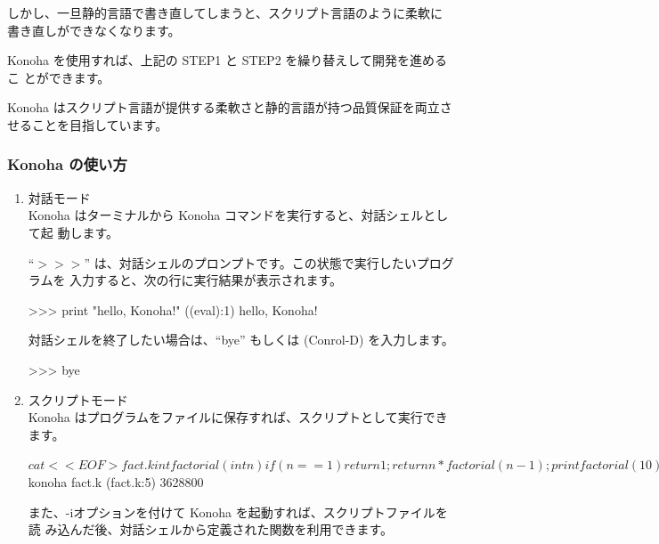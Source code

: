 \documentclass[mingoth,a4paper]{jsarticle}
\begin{document}
しかし、一旦静的言語で書き直してしまうと、スクリプト言語のように柔軟に
書き直しができなくなります。

Konoha を使用すれば、上記の STEP1 と STEP2 を繰り替えして開発を進めるこ
とができます。

Konoha はスクリプト言語が提供する柔軟さと静的言語が持つ品質保証を両立さ
せることを目指しています。

\subsubsection{Konoha の使い方}
\begin{enumerate}
\item 対話モード\\
Konoha はターミナルから Konoha コマンドを実行すると、対話シェルとして起
動します。


``$>>>$'' は、対話シェルのプロンプトです。この状態で実行したいプログラムを
入力すると、次の行に実行結果が表示されます。

\begin{commandline}
>>> print "hello, Konoha!"
((eval):1) hello, Konoha!
\end{commandline}

対話シェルを終了したい場合は、``bye'' もしくは (Conrol-D) を入力します。

\begin{commandline}
>>> bye
\end{commandline}

\item スクリプトモード\\
Konoha はプログラムをファイルに保存すれば、スクリプトとして実行できます。

\begin{commandline}
$ cat <<EOF > fact.k
int factorial(int n) {
  if(n == 1) return 1;
  return n * factorial(n - 1);
}
print factorial(10);
EOF

$ konoha fact.k
(fact.k:5) 3628800
\end{commandline}

また、-iオプションを付けて Konoha を起動すれば、スクリプトファイルを読
み込んだ後、対話シェルから定義された関数を利用できます。


\end{enumerate}
\end{document}
